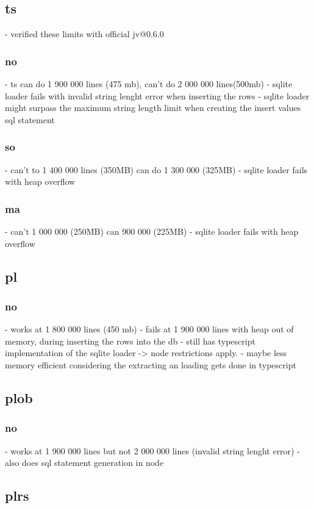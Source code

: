 \subsection{ts}

- verified these limits with official jv@0.6.0

\subsubsection{no}
- ts can do 1 900 000 lines (475 mb), can't do 2 000 000 lines(500mb)
- sqlite loader fails with invalid string lenght error when inserting the rows
- sqlite loader might surpass the maximum string length limit when creating the insert values sql statement
\subsubsection{so}
- can't to 1 400 000 lines (350MB) can do 1 300 000 (325MB)
- sqlite loader fails with heap overflow
\subsubsection{ma}
- can't 1 000 000 (250MB) can 900 000 (225MB)
- sqlite loader fails with heap overflow

\subsection{pl}
\subsubsection{no}
- works at 1 800 000 lines (450 mb)
- fails at 1 900 000 lines with heap out of memory, during inserting the rows into the db
- still has typescript implementation of the sqlite loader -> node restrictions apply.
- maybe less memory efficient considering the extracting an loading gets done in typescript

\subsection{plob}
\subsubsection{no}
- works at 1 900 000 lines but not 2 000 000 lines (invalid string lenght error)
- also does sql statement generation in node

\subsection{plrs}
